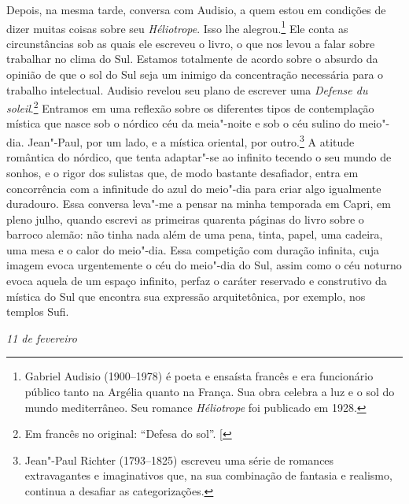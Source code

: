 Depois, na mesma tarde, conversa com Audisio, a quem estou em
condições de dizer muitas coisas sobre seu \emph{Héliotrope}. Isso lhe
alegrou.\footnote{Gabriel Audisio (1900--1978) é poeta e ensaísta
  francês e era funcionário público tanto na Argélia quanto na França.
  Sua obra celebra a luz e o sol do mundo mediterrâneo. Seu romance
  \emph{Héliotrope} foi publicado em 1928. \versal{[N.~O.]}} Ele conta as circunstâncias
sob as quais ele escreveu o livro, o que nos levou a falar sobre
trabalhar no clima do Sul. Estamos totalmente de acordo sobre o absurdo
da opinião de que o sol do Sul seja um inimigo da concentração
necessária para o trabalho intelectual. Audisio revelou seu plano
de escrever uma \emph{Defense du soleil}.\footnote{Em francês no original: ``Defesa do sol''. {[}\versal{N.~T.}{]}} Entramos em uma reflexão sobre os
diferentes tipos de contemplação mística que nasce sob o nórdico céu da
meia"-noite e sob o céu sulino do meio"-dia. Jean"-Paul, por um lado, e a
mística oriental, por outro.\footnote{Jean"-Paul Richter (1793--1825)
  escreveu uma série de romances extravagantes e imaginativos que, na sua
  combinação de fantasia e realismo, continua a desafiar as
  categorizações. \versal{[N.~O.]}} A atitude romântica do nórdico, que tenta adaptar"-se
ao infinito tecendo o seu mundo de sonhos, e o rigor dos sulistas que,
de modo bastante desafiador, entra em concorrência com a infinitude do
azul do meio"-dia para criar algo igualmente duradouro. Essa conversa
leva"-me a pensar na minha temporada em Capri, em pleno julho, quando
escrevi as primeiras quarenta páginas do livro sobre o barroco alemão:
não tinha nada além de uma pena, tinta, papel, uma cadeira, uma mesa e o
calor do meio"-dia. Essa competição com duração infinita, cuja imagem
evoca urgentemente o céu do meio"-dia do Sul, assim como o céu noturno evoca
aquela de um espaço infinito, perfaz o caráter reservado e construtivo
da mística do Sul que encontra sua expressão arquitetônica, por exemplo,
nos templos Sufi.

\begin{flushright}
\emph{11 de fevereiro}
\end{flushright}

